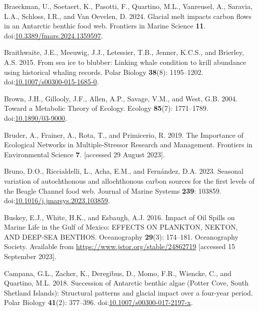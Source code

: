 \documentclass[
]{article}
\newlength{\cslhangindent}
\newenvironment{CSLReferences}[2] %
 {\begin{list}{}{%
  \setlength{\itemindent}{0pt}
  \setlength{\leftmargin}{0pt}
  \setlength{\parsep}{0pt}
  \ifodd #1
   \setlength{\leftmargin}{\cslhangindent}
   \setlength{\itemindent}{-1\cslhangindent}
  \fi
  \setlength{\itemsep}{#2\baselineskip}}}
 {\end{list}}
\begin{document}
\begin{CSLReferences}{1}{0}
Braeckman, U., Soetaert, K., Pasotti, F., Quartino, M.L., Vanreusel, A.,
Saravia, L.A., Schloss, I.R., and Van Oevelen, D. 2024. Glacial melt
impacts carbon flows in an {Antarctic} benthic food web. Frontiers in
Marine Science \textbf{11}.
doi:\href{https://doi.org/10.3389/fmars.2024.1359597}{10.3389/fmars.2024.1359597}.

Braithwaite, J.E., Meeuwig, J.J., Letessier, T.B., Jenner, K.C.S., and
Brierley, A.S. 2015. From sea ice to blubber: Linking whale condition to
krill abundance using historical whaling records. Polar Biology
\textbf{38}(8): 1195--1202.
doi:\href{https://doi.org/10.1007/s00300-015-1685-0}{10.1007/s00300-015-1685-0}.

Brown, J.H., Gillooly, J.F., Allen, A.P., Savage, V.M., and West, G.B.
2004. Toward a {Metabolic Theory} of {Ecology}. Ecology \textbf{85}(7):
1771--1789. doi:\href{https://doi.org/10.1890/03-9000}{10.1890/03-9000}.

Bruder, A., Frainer, A., Rota, T., and Primicerio, R. 2019. The
{Importance} of {Ecological Networks} in {Multiple-Stressor Research}
and {Management}. Frontiers in Environmental Science \textbf{7}.
{[}accessed 29 August 2023{]}.

Bruno, D.O., Riccialdelli, L., Acha, E.M., and Fernández, D.A. 2023.
Seasonal variation of autochthonous and allochthonous carbon sources for
the first levels of the {Beagle Channel} food web. Journal of Marine
Systems \textbf{239}: 103859.
doi:\href{https://doi.org/10.1016/j.jmarsys.2023.103859}{10.1016/j.jmarsys.2023.103859}.

Buskey, E.J., White, H.K., and Esbaugh, A.J. 2016. Impact of {Oil
Spills} on {Marine Life} in the {Gulf} of {Mexico}: {EFFECTS ON
PLANKTON}, {NEKTON}, {AND DEEP-SEA BENTHOS}. Oceanography
\textbf{29}(3): 174--181. Oceanography Society. Available from
\url{https://www.jstor.org/stable/24862719} {[}accessed 15 September
2023{]}.

Campana, G.L., Zacher, K., Deregibus, D., Momo, F.R., Wiencke, C., and
Quartino, M.L. 2018. Succession of {Antarctic} benthic algae ({Potter
Cove}, {South Shetland Islands}): Structural patterns and glacial impact
over a four-year period. Polar Biology \textbf{41}(2): 377--396.
doi:\href{https://doi.org/10.1007/s00300-017-2197-x}{10.1007/s00300-017-2197-x}.


\end{CSLReferences}
\end{document}
